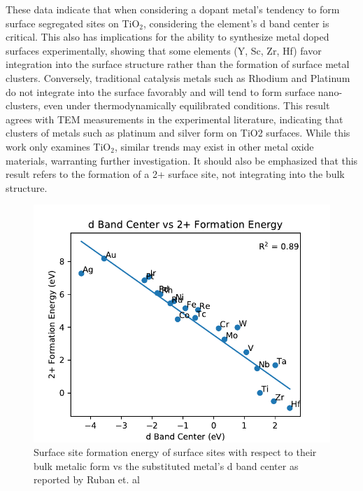 \documentclass[catalysts,article,submit,moreauthors,pdftex,10pt,a4paper]{mdpi}
\theoremstyle{mdpi}
\newcounter{ex}
\newcounter{re}
\theoremstyle{mdpidefinition}
\begin{document}
These data indicate that when considering a dopant metal's tendency to form surface segregated sites on TiO$_2$, considering the element's d band center is critical. This also has implications for the ability to synthesize metal doped surfaces experimentally, showing that some elements (Y, Sc, Zr, Hf) favor integration into the surface structure rather than the formation of surface metal clusters. Conversely, traditional catalysis metals such as Rhodium and Platinum do not integrate into the surface favorably and will tend to form surface nano-clusters, even under thermodynamically equilibrated conditions. This result agrees with TEM measurements in the experimental literature, indicating that clusters of metals such as platinum and silver form on TiO2 surfaces.\cite{Iliev_2006}  While this work only examines TiO$_2$, similar trends may exist in other metal oxide materials, warranting further investigation. It should also be emphasized that this result refers to the formation of a 2+ surface site, not integrating into the bulk structure.

\begin{figure}
    \centering
    \includegraphics[width=0.8\linewidth]{Images/d_band_vs_formation.pdf}
    \caption{Surface site formation energy of surface sites with respect to their bulk metalic form vs the substituted metal's d band center as reported by Ruban et. al \cite{Ruban_1997}}
    \label{fig:d_band}
\end{figure}
\end{document}
